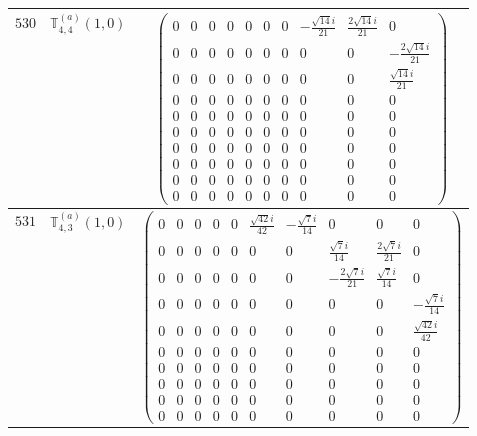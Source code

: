 \documentclass[fleqn,8pt,landscape]{jsarticle}
\begin{document}
\begin{center}
\begin{longtable}{ccc}
$ 530 $ & $ \mathbb{T}_{4,4}^{(a)}(1,0) $ & $ \begin{pmatrix} 0 & 0 & 0 & 0 & 0 & 0 & 0 & - \frac{\sqrt{14} i}{21} & \frac{2 \sqrt{14} i}{21} & 0 \\ 0 & 0 & 0 & 0 & 0 & 0 & 0 & 0 & 0 & - \frac{2 \sqrt{14} i}{21} \\ 0 & 0 & 0 & 0 & 0 & 0 & 0 & 0 & 0 & \frac{\sqrt{14} i}{21} \\ 0 & 0 & 0 & 0 & 0 & 0 & 0 & 0 & 0 & 0 \\ 0 & 0 & 0 & 0 & 0 & 0 & 0 & 0 & 0 & 0 \\ 0 & 0 & 0 & 0 & 0 & 0 & 0 & 0 & 0 & 0 \\ 0 & 0 & 0 & 0 & 0 & 0 & 0 & 0 & 0 & 0 \\ 0 & 0 & 0 & 0 & 0 & 0 & 0 & 0 & 0 & 0 \\ 0 & 0 & 0 & 0 & 0 & 0 & 0 & 0 & 0 & 0 \\ 0 & 0 & 0 & 0 & 0 & 0 & 0 & 0 & 0 & 0 \end{pmatrix} $ \\ \hline
$ 531 $ & $ \mathbb{T}_{4,3}^{(a)}(1,0) $ & $ \begin{pmatrix} 0 & 0 & 0 & 0 & 0 & \frac{\sqrt{42} i}{42} & - \frac{\sqrt{7} i}{14} & 0 & 0 & 0 \\ 0 & 0 & 0 & 0 & 0 & 0 & 0 & \frac{\sqrt{7} i}{14} & \frac{2 \sqrt{7} i}{21} & 0 \\ 0 & 0 & 0 & 0 & 0 & 0 & 0 & - \frac{2 \sqrt{7} i}{21} & \frac{\sqrt{7} i}{14} & 0 \\ 0 & 0 & 0 & 0 & 0 & 0 & 0 & 0 & 0 & - \frac{\sqrt{7} i}{14} \\ 0 & 0 & 0 & 0 & 0 & 0 & 0 & 0 & 0 & \frac{\sqrt{42} i}{42} \\ 0 & 0 & 0 & 0 & 0 & 0 & 0 & 0 & 0 & 0 \\ 0 & 0 & 0 & 0 & 0 & 0 & 0 & 0 & 0 & 0 \\ 0 & 0 & 0 & 0 & 0 & 0 & 0 & 0 & 0 & 0 \\ 0 & 0 & 0 & 0 & 0 & 0 & 0 & 0 & 0 & 0 \\ 0 & 0 & 0 & 0 & 0 & 0 & 0 & 0 & 0 & 0 \end{pmatrix} $ \\ \hline

\end{longtable}
\end{center}
\end{document}
